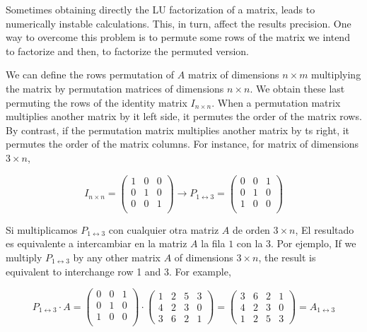 \begin{paracol}{2}
Sometimes obtaining directly the LU factorization of a matrix, leads to numerically instable calculations. This, in turn, affect the results precision. One way to overcome this problem is to permute some rows of the matrix we intend to factorize and then, to factorize the permuted version.

We can define the rows permutation of $A$ matrix of dimensions $n\times m$ multiplying the matrix by permutation matrices of dimensions $n\times n$. We obtain these last permuting the rows of the identity matrix $I_{n\times n}$.  When a permutation matrix multiplies another matrix by it left side, it permutes the order of the matrix rows. By contrast, if the permutation matrix multiplies another matrix by ts right, it permutes the order of the matrix columns. For instance, for matrix of dimensions $3\times n$, 

\end{paracol}
\begin{equation*}
I_{n \times n}=\begin{pmatrix}
1& 0& 0\\
0& 1& 0\\
0& 0& 1\\
\end{pmatrix} \rightarrow P_{1 \leftrightarrow 3}= \begin{pmatrix}
0& 0& 1\\
0& 1& 0\\
1& 0& 0\\
\end{pmatrix}
\end{equation*}
\begin{paracol}{2}
Si multiplicamos $P_{1 \leftrightarrow 3}$ con cualquier otra matriz $A$ de orden $3\times n$, El resultado es equivalente a intercambiar en la matriz $A$ la fila $1$ con la $3$. Por ejemplo,
\switchcolumn
If we multiply $P_{1\leftrightarrow 3}$ by any other matrix $A$ of dimensions $3\times n$, the result is equivalent to interchange row 1 and 3. For example, 
\end{paracol}
\begin{equation*}
P_{1\leftrightarrow 3}\cdot A=\begin{pmatrix}
0& 0& 1\\
0& 1& 0\\
1& 0& 0\\
\end{pmatrix} \cdot \begin{pmatrix}
1& 2& 5& 3\\
4& 2& 3& 0\\
3& 6& 2& 1
\end{pmatrix} = \begin{pmatrix}
3& 6& 2& 1\\
4& 2& 3& 0\\
1& 2& 5& 3
\end{pmatrix}= A_{1\leftrightarrow 3}
\end{equation*}

